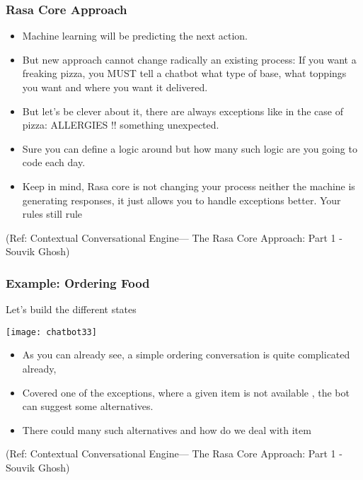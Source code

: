  \begin{frame}[fragile]\frametitle{Rasa Core Approach}
\begin{itemize}
\item Machine learning will be predicting the next action.
\item But new approach cannot change radically an existing process: If you want a freaking pizza, you MUST tell a chatbot what type of base, what toppings you want and where you want it delivered.
\item 
But let's be clever about it, there are always exceptions like in the case of pizza: ALLERGIES !! something unexpected. 
\item Sure you can define a logic around but how many such logic are you going to code each day.
\item Keep in mind, Rasa core is not changing your process neither the machine is generating responses, it just allows you to handle exceptions better. Your rules still rule
\end{itemize}

\tiny{(Ref: Contextual Conversational Engine— The Rasa Core Approach: Part 1 - Souvik Ghosh)}

\end{frame}

 \begin{frame}[fragile]\frametitle{Example: Ordering Food}
 
 Let's build the different states
 
\begin{center}
\texttt{[image: chatbot33]}

\end{center}

\begin{itemize}
\item As you can already see, a simple ordering conversation is quite complicated already, 
\item Covered one of the exceptions, where a given item is not available , the bot can suggest some alternatives. 
\item There could many such alternatives and how do we deal with item
\end{itemize}


\tiny{(Ref: Contextual Conversational Engine— The Rasa Core Approach: Part 1 - Souvik Ghosh)}

\end{frame}

